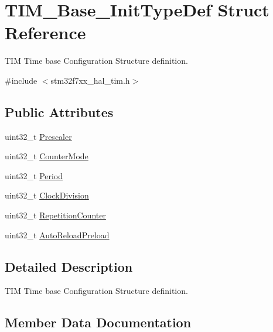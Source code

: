 \hypertarget{struct_t_i_m___base___init_type_def}{}\section{T\+I\+M\+\_\+\+Base\+\_\+\+Init\+Type\+Def Struct Reference}
\label{struct_t_i_m___base___init_type_def}


T\+IM Time base Configuration Structure definition.  




{\ttfamily \#include $<$stm32f7xx\+\_\+hal\+\_\+tim.\+h$>$}

\subsection*{Public Attributes}
\begin{DoxyCompactItemize}
\item 
uint32\+\_\+t \mbox{\hyperlink{struct_t_i_m___base___init_type_def_afc886119e6709bb576d25b5cf8d12d92}{Prescaler}}
\item 
uint32\+\_\+t \mbox{\hyperlink{struct_t_i_m___base___init_type_def_a16d0c02a8f35426360a64c0706656e35}{Counter\+Mode}}
\item 
uint32\+\_\+t \mbox{\hyperlink{struct_t_i_m___base___init_type_def_a8fab2bc184bb756763ff59c729b5be55}{Period}}
\item 
uint32\+\_\+t \mbox{\hyperlink{struct_t_i_m___base___init_type_def_ade59c3a547a5409da845592f30596d17}{Clock\+Division}}
\item 
uint32\+\_\+t \mbox{\hyperlink{struct_t_i_m___base___init_type_def_aa949328175500fd1d112f64a4db5ae79}{Repetition\+Counter}}
\item 
uint32\+\_\+t \mbox{\hyperlink{struct_t_i_m___base___init_type_def_a29e7b91a384f12e6be0f3ffb62ea1ea7}{Auto\+Reload\+Preload}}
\end{DoxyCompactItemize}


\subsection{Detailed Description}
T\+IM Time base Configuration Structure definition. 

\subsection{Member Data Documentation}
\mbox{\label{struct_t_i_m___base___init_type_def_a29e7b91a384f12e6be0f3ffb62ea1ea7}} 

